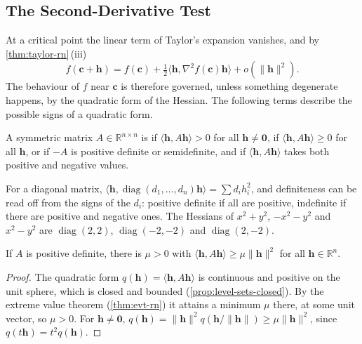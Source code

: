 \subsection{The Second-Derivative Test}

At a critical point the linear term of Taylor's expansion vanishes, and by \cref{thm:taylor-rn}\,(iii)
\[
f(\mathbf c+\mathbf h)=f(\mathbf c)+\tfrac12\langle\mathbf h,\nabla^2f(\mathbf c)\mathbf h\rangle+o(\|\mathbf h\|^2).
\]
The behaviour of $f$ near $\mathbf c$ is therefore governed, unless something degenerate happens, by the quadratic form of the Hessian. The following terms describe the possible signs of a quadratic form.

\begin{definition}[Definiteness]
\label{def:definite}
A symmetric matrix $A\in\mathbb R^{n\times n}$ is  if $\langle\mathbf h,A\mathbf h\rangle>0$ for all $\mathbf h\ne\mathbf0$,  if $\langle\mathbf h,A\mathbf h\rangle\ge0$ for all $\mathbf h$,  or  if $-A$ is positive definite or semidefinite, and  if $\langle\mathbf h,A\mathbf h\rangle$ takes both positive and negative values.
\end{definition}

For a diagonal matrix, $\langle\mathbf h,\operatorname{diag}(d_1,\ldots,d_n)\mathbf h\rangle=\sum d_ih_i^2$, and definiteness can be read off from the signs of the $d_i$: positive definite if all are positive, indefinite if there are positive and negative ones. The Hessians of $x^2+y^2$, $-x^2-y^2$ and $x^2-y^2$ are $\operatorname{diag}(2,2)$, $\operatorname{diag}(-2,-2)$ and $\operatorname{diag}(2,-2)$.

\begin{lemma}
\label{lem:definite-bound}
If $A$ is positive definite, there is $\mu>0$ with $\langle\mathbf h,A\mathbf h\rangle\ge\mu\|\mathbf h\|^2$ for all $\mathbf h\in\mathbb R^n$.
\end{lemma}

\begin{proof}
The quadratic form $q(\mathbf h)=\langle\mathbf h,A\mathbf h\rangle$ is continuous and positive on the unit sphere, which is closed and bounded (\cref{prop:level-sets-closed}). By the extreme value theorem (\cref{thm:evt-rn}) it attains a minimum $\mu$ there, at some unit vector, so $\mu>0$. For $\mathbf h\ne\mathbf0$, $q(\mathbf h)=\|\mathbf h\|^2q(\mathbf h/\|\mathbf h\|)\ge\mu\|\mathbf h\|^2$, since $q(t\mathbf h)=t^2q(\mathbf h)$.
\end{proof}

